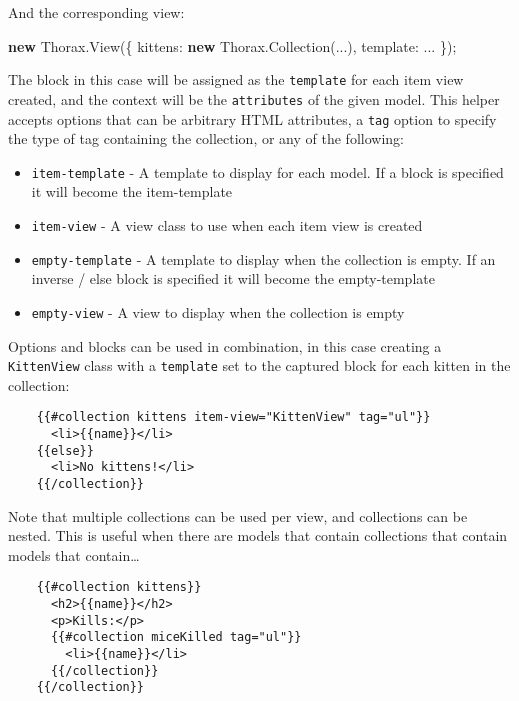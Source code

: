 \documentclass[9pt]{book}
\newenvironment{Shaded}{}{}
\newcommand{\KeywordTok}[1]{\textcolor[rgb]{0.00,0.44,0.13}{\textbf{{#1}}}}
\newcommand{\DataTypeTok}[1]{\textcolor[rgb]{0.56,0.13,0.00}{{#1}}}
\newcommand{\OtherTok}[1]{\textcolor[rgb]{0.00,0.44,0.13}{{#1}}}
\newcommand{\FunctionTok}[1]{\textcolor[rgb]{0.02,0.16,0.49}{{#1}}}
\newcommand{\NormalTok}[1]{{#1}}
\begin{document}
And the corresponding view:

\begin{Shaded}
\begin{Highlighting}[]
    \KeywordTok{new} \OtherTok{Thorax}\NormalTok{.}\FunctionTok{View}\NormalTok{(\{}
      \DataTypeTok{kittens}\NormalTok{: }\KeywordTok{new} \OtherTok{Thorax}\NormalTok{.}\FunctionTok{Collection}\NormalTok{(...),}
      \DataTypeTok{template}\NormalTok{: ...}
    \NormalTok{\});}
\end{Highlighting}
\end{Shaded}

The block in this case will be assigned as the \texttt{template} for
each item view created, and the context will be the \texttt{attributes}
of the given model. This helper accepts options that can be arbitrary
HTML attributes, a \texttt{tag} option to specify the type of tag
containing the collection, or any of the following:

\begin{itemize}
\itemsep1pt\parskip0pt
\item
  \texttt{item-template} - A template to display for each model. If a
  block is specified it will become the item-template
\item
  \texttt{item-view} - A view class to use when each item view is
  created
\item
  \texttt{empty-template} - A template to display when the collection is
  empty. If an inverse / else block is specified it will become the
  empty-template
\item
  \texttt{empty-view} - A view to display when the collection is empty
\end{itemize}

Options and blocks can be used in combination, in this case creating a
\texttt{KittenView} class with a \texttt{template} set to the captured
block for each kitten in the collection:

\begin{verbatim}
    {{#collection kittens item-view="KittenView" tag="ul"}}
      <li>{{name}}</li>
    {{else}}
      <li>No kittens!</li>
    {{/collection}}
\end{verbatim}

Note that multiple collections can be used per view, and collections can
be nested. This is useful when there are models that contain collections
that contain models that contain\ldots{}

\begin{verbatim}
    {{#collection kittens}}
      <h2>{{name}}</h2>
      <p>Kills:</p>
      {{#collection miceKilled tag="ul"}}
        <li>{{name}}</li>
      {{/collection}}
    {{/collection}}
\end{verbatim}
\end{document}
